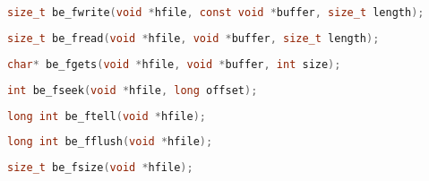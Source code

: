 
\begin{lstlisting}[language=c, numbers=none]
size_t be_fwrite(void *hfile, const void *buffer, size_t length);
\end{lstlisting}


\begin{lstlisting}[language=c, numbers=none]
size_t be_fread(void *hfile, void *buffer, size_t length);
\end{lstlisting}


\begin{lstlisting}[language=c, numbers=none]
char* be_fgets(void *hfile, void *buffer, int size);
\end{lstlisting}


\begin{lstlisting}[language=c, numbers=none]
int be_fseek(void *hfile, long offset);
\end{lstlisting}


\begin{lstlisting}[language=c, numbers=none]
long int be_ftell(void *hfile);
\end{lstlisting}


\begin{lstlisting}[language=c, numbers=none]
long int be_fflush(void *hfile);
\end{lstlisting}


\begin{lstlisting}[language=c, numbers=none]
size_t be_fsize(void *hfile);
\end{lstlisting}